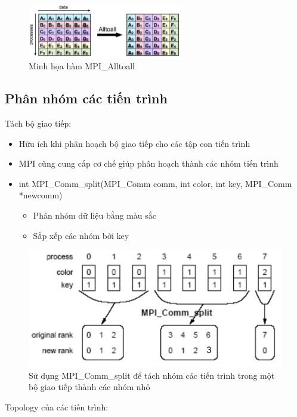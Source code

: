 \documentclass[14pt, a4paper]{article}
\numberwithin{equation}{section}
\numberwithin{figure}{section}
\numberwithin{dl}{section}
\numberwithin{md}{section}
\numberwithin{bd}{section}
\numberwithin{dn}{section}
\numberwithin{hq}{section}
\begin{document}
\begin{figure}[H]
    \centering
    \includegraphics[width=0.6\textwidth]{figures/MPI/Alltoall.png}
    \caption{Minh họa hàm MPI\_Alltoall}
\end{figure}

\subsection{Phân nhóm các tiến trình}

Tách bộ giao tiếp:

\begin{itemize}
    \item Hữu ích khi phân hoạch bộ giao tiếp cho các tập con tiến trình
    \item MPI cũng cung cấp cơ chế giúp phân hoạch thành các nhóm tiến trình
    \item int MPI\_Comm\_split(MPI\_Comm comm, int color, int key,
                               MPI\_Comm *newcomm)
    \begin{itemize}
        \item Phân nhóm dữ liệu bằng màu sắc
        \item Sắp xếp các nhóm bởi key
    \end{itemize}
\end{itemize}

\begin{figure}[H]
    \centering
    \includegraphics[width=0.7\linewidth]{figures/MPI/Split_Communicator.png}
    \caption{Sử dụng MPI\_Comm\_split để tách nhóm các tiến trình trong một bộ giao tiếp thành các nhóm nhỏ}
\end{figure}

Topology của các tiến trình:
\end{document}
